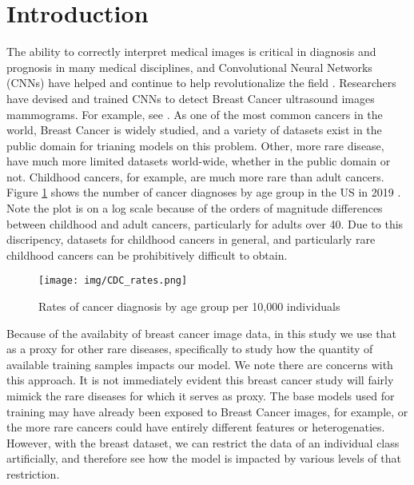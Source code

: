 \documentclass[sn-mathphys,Numbered]{sn-jnl}%
\theoremstyle{thmstyleone}%
\theoremstyle{thmstyletwo}%
\theoremstyle{thmstylethree}%
\begin{document}
\section{Introduction}\label{sec_intro}
The ability to correctly interpret medical images is critical in diagnosis and prognosis in many medical disciplines, and Convolutional Neural Networks (CNNs) have helped and continue to help revolutionalize the field \cite{2022_survey}.  Researchers have devised and trained CNNs to detect Breast Cancer ultrasound images mammograms.  For example, see \cite{AREVALO2016248}.  As one of the most common cancers in the world, Breast Cancer is widely studied, and a variety of datasets exist in the public domain for trianing models on this problem.  Other, more rare disease, have much more limited datasets world-wide, whether in the public domain or not.  Childhood cancers, for example, are much more rare than adult cancers.  Figure \ref{fig:CDC_Rates} shows the number of cancer diagnoses by age group in the US in 2019 \cite{cdc}.  Note the plot is on a log scale because of the orders of magnitude differences between childhood and adult cancers, particularly for adults over 40.  Due to this discripency, datasets for childhood cancers in general, and particularly rare childhood cancers can be prohibitively difficult to obtain.  


\begin{figure}[!htbp]
    \centering

    \texttt{[image: img/CDC\_rates.png]}

    \caption{Rates of cancer diagnosis by age group per 10,000 individuals \cite{cdc}}
    \label{fig:CDC_Rates}
\end{figure}


Because of the availabity of breast cancer image data, in this study we use that as a proxy for other rare diseases, specifically to study how the quantity of available training samples impacts our model.  We note there are concerns with this approach.  It is not immediately evident this breast cancer study will fairly mimick the rare diseases for which it serves as proxy.  The base models used for training may have already been exposed to Breast Cancer images, for example, or the more rare cancers could have entirely different features or heterogenaties.   However, with the breast dataset, we can restrict the data of an individual class artificially, and therefore see how the model is impacted by various levels of that restriction.
\end{document}
